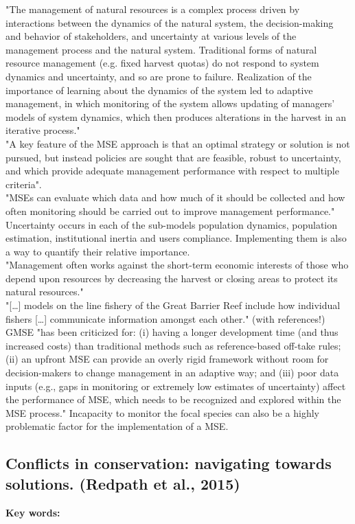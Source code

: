 \documentclass[12pt]{article}
\begin{document}
"The management of natural resources is a complex process driven by interactions between the dynamics of the natural system, the decision-making and behavior of stakeholders, and uncertainty at various levels of the management process and the natural system. Traditional forms of natural resource management (e.g. fixed harvest quotas) do not respond to system dynamics and uncertainty, and so are prone to failure. Realization of the importance of learning about the dynamics of the system led to adaptive management, in which monitoring of the system allows updating of managers’ models of system dynamics, which then produces alterations in the harvest in an iterative process."\\
"A key feature of the MSE approach is that an optimal strategy or solution is not pursued, but instead policies are sought that are feasible, robust to uncertainty, and which provide adequate management performance with respect to multiple criteria".\\
"MSEs can evaluate which data and how much of it should be collected and how often monitoring should be carried out to improve management performance."\\
Uncertainty occurs in each of the sub-models population dynamics, population estimation, institutional inertia and users compliance. Implementing them is also a way to quantify their relative importance.\\
"Management often works against the short-term economic interests of those who depend upon resources by decreasing the harvest or closing areas to protect its natural resources."\\
"[\dots] models on the line fishery of the Great Barrier Reef include how individual fishers [\dots] communicate
information amongst each other." (with references!)\\
GMSE "has been criticized for: (i) having a longer development time (and thus increased costs) than traditional methods such as reference-based off-take rules; (ii) an upfront MSE can provide an overly rigid framework without room for decision-makers to change management in an adaptive way; and (iii) poor data inputs (e.g., gaps in monitoring or extremely low estimates of uncertainty) affect the performance of MSE, which needs to be recognized and explored within the MSE process." Incapacity to monitor the focal species can also be a highly problematic factor for the implementation of a MSE.

\subsection{Conflicts in conservation: navigating towards solutions. (Redpath et al., 2015)}
\textbf{Key words:}\\
\end{document}
